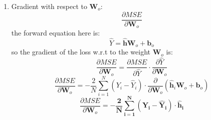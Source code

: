 \documentclass{article}
\begin{document}
\begin{enumerate}
    \item Gradient with respect to $\mathbf{W}_o$: $$\frac{\partial MSE}{\partial \mathbf{W}_o}$$
    the forward equation here is:
    \[
    \hat{Y} = \mathbf{\hat{h}} \mathbf{W}_o + \mathbf{b}_o
    \]
    so the gradient of the loss w.r.t to the weight $\mathbf{W}_o$ is:
    \[
    \frac{\partial MSE}{\partial \mathbf{W}_o} = \frac{\partial MSE}{\partial \hat{Y}} \cdot \frac{\partial \hat{Y}}{\partial \mathbf{W}_o}
    \]
    \[
    \frac{\partial MSE}{\partial \mathbf{W}_o} = -\frac{2}{N} \sum_{i=1}^{N} (Y_i - \hat{Y}_i) \cdot \frac{\partial}{\partial \mathbf{W}_o} (\mathbf{\hat{h}}_i \mathbf{W}_o + \mathbf{b}_o)
    \]
    \[
    \frac{\partial MSE}{\partial \mathbf{W}_o} = \mathbf{-\frac{2}{N} \sum_{i=1}^{N} (Y_i - \hat{Y}_i) \cdot \mathbf{\hat{h}}_i}
    \]
    

\end{enumerate}
\end{document}
